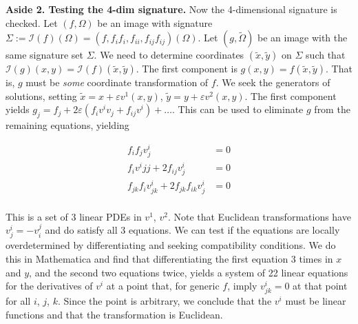 \documentclass{article}
\begin{document}
{\narrower\small 
{\bf Aside 2. Testing the 4-dim signature.} 
Now the 4-dimensional signature is checked. Let $(f,\Omega)$ be an image with
signature $\Sigma := \mathcal{I}(f)(\Omega) = (f,f_if_i,f_{ii},f_{ij}f_{ij})(\Omega)$. Let $(g,\widetilde\Omega)$ be
an image with the same signature set $\Sigma$. We need to determine coordinates 
$(\tilde x,\tilde y)$ on $\Sigma$ such that $\mathcal{I}(g)(x,y) = \mathcal{I}(f)(\tilde x,\tilde y)$.
The first component is $g(x,y)=f(\tilde x,\tilde y)$. That is, $g$ must be {\em some} coordinate
transformation of $f$. 
We seek the generators of solutions, setting $\tilde x = x + \varepsilon v^1(x,y)$,
$\tilde y = y + \varepsilon v^2(x,y)$. The first component yields $g_j = f_j + 2\varepsilon (f_i v^i v_j + 
f_{ij}v^i) + \dots$. This can be used to eliminate $g$ from the remaining equations, yielding

\begin{equation}
\begin{aligned}
f_i f_j v^{i}_j &= 0 \\
f_i v^i{jj} + 2 f_{ij}v^i_j&= 0\\
f_{jk}f_i v^i_{jk} + 2 f_{jk}f_{ik}v^i_j &= 0\\
\end{aligned}
\end{equation}

This is a set of 3 linear PDEs in $v^1$, $v^2$. Note that Euclidean
transformations have $v^i_j = -v^j_i$ and do satisfy all 3 equations. We can test
if the equations are locally overdetermined by differentiating and seeking compatibility 
conditions. We do this in Mathematica and find that differentiating the first equation 
3 times in $x$ and $y$, and the second two equations twice, yields a system
of 22 linear equations for the derivatives of $v^i$ at a point that,
for generic $f$, imply $v^i_{jk}=0$ at that point for all $i$, $j$, $k$. Since the point is arbitrary,
we conclude that the $v^i$ must be linear functions and that the transformation
is Euclidean.

}

\medskip
\end{document}
